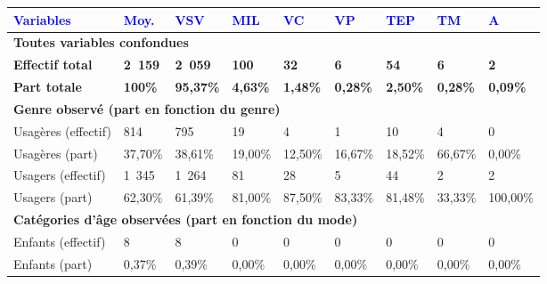         \begin{longtable}{p{3.7cm}p{0.9cm}p{0.9cm}p{0.9cm}p{0.9cm}p{0.9cm}p{0.9cm}p{0.9cm}p{0.9cm}}
         \textcolor{blue}{\textbf{Variables}} & \textcolor{blue}{\textbf{Moy.}} & \textcolor{blue}{\textbf{VSV}} & \textcolor{blue}{\textbf{MIL}} & \textcolor{blue}{\textbf{VC}} & \textcolor{blue}{\textbf{VP}} & \textcolor{blue}{\textbf{TEP}} & \textcolor{blue}{\textbf{TM}} & \textcolor{blue}{\textbf{A}}\\
        \hline
        \endhead        
\multicolumn{9}{l}{\textbf{Toutes variables confondues}}\\
    \small{\textbf{Effectif total}} & \small{\textbf{2~159}} & \small{\textbf{2~059}} & \small{\textbf{100}} & \small{\textbf{32}} & \small{\textbf{6}} & \small{\textbf{54}} & \small{\textbf{6}} & \small{\textbf{2}}\\    
    \small{\textbf{Part totale}} & \small{\textbf{100\%}} & \small{\textbf{95,37\%}} & \small{\textbf{4,63\%}} & \small{\textbf{1,48\%}} & \small{\textbf{0,28\%}} & \small{\textbf{2,50\%}} & \small{\textbf{0,28\%}} & \small{\textbf{0,09\%}}\\
    \hline    
\multicolumn{9}{l}{\textbf{Genre observé (part en fonction du genre)}}\\
    \small{Usagères (effectif)} & \small{814} & \small{795} & \small{19} & \small{4} & \small{1} & \small{10} & \small{4} & \small{0}\\    
    \small{Usagères (part)} & \small{37,70\%} & \small{38,61\%} & \small{19,00\%} & \small{12,50\%} & \small{16,67\%} & \small{18,52\%} & \small{66,67\%} & \small{0,00\%}\\    
    \small{Usagers (effectif)} & \small{1~345} & \small{1~264} & \small{81} & \small{28} & \small{5} & \small{44} & \small{2} & \small{2}\\    
    \small{Usagers (part)} & \small{62,30\%} & \small{61,39\%} & \small{81,00\%} & \small{87,50\%} & \small{83,33\%} & \small{81,48\%} & \small{33,33\%} & \small{100,00\%}\\
    \hline    
\multicolumn{9}{l}{\textbf{Catégories d'âge observées (part en fonction du mode)}}\\
    \small{Enfants (effectif)} & \small{8} & \small{8} & \small{0} & \small{0} & \small{0} & \small{0} & \small{0} & \small{0}\\    
    \small{Enfants (part)} & \small{0,37\%} & \small{0,39\%} & \small{0,00\%} & \small{0,00\%} & \small{0,00\%} & \small{0,00\%} & \small{0,00\%} & \small{0,00\%}\\    

\end{longtable}
